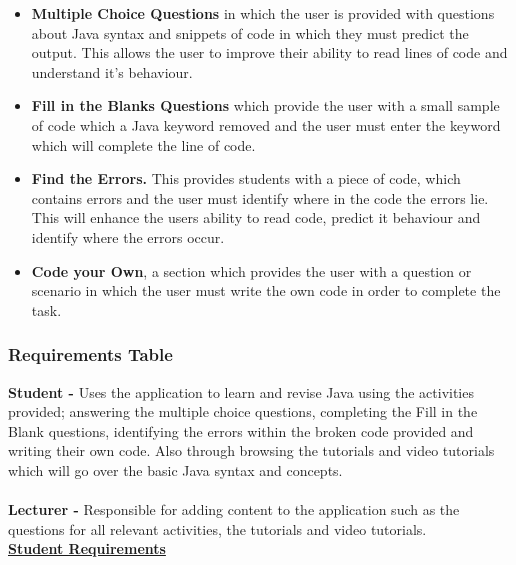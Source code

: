 \documentclass{article}
\begin{document}
\begin{itemize}
\item \textbf{Multiple Choice Questions} in which the user is provided with questions about Java syntax and snippets of code in which they must predict the output. This allows the user to improve their ability to read lines of code and understand it's behaviour.
\item \textbf{Fill in the Blanks Questions} which provide the user with a small sample of code which a Java keyword removed and the user must enter the keyword which will complete the line of code.
\item \textbf{Find the Errors.} This provides students with a piece of code, which contains errors and the user must identify where in the code the errors lie. This will enhance the users ability to read code, predict it behaviour and identify where the errors occur.
\item \textbf{Code your Own}, a section which provides the user with a question or scenario in which the user must write the own code in order to complete the task.
\end{itemize}

\subsubsection{Requirements Table}

\textbf{Student - } Uses the application to learn and revise Java using the activities provided; answering the multiple choice questions, completing the Fill in the Blank questions, identifying the errors within the broken code provided and writing their own code. Also through browsing the tutorials and video tutorials which will go over the basic Java syntax and concepts.\\
\\
\textbf{Lecturer - } Responsible for adding content to the application such as the questions for all relevant activities, the tutorials and video tutorials.\\

\textbf{\underline{Student Requirements}}\\
\end{document}
